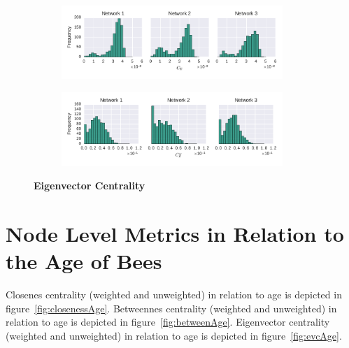 \begin{figure}[htb]
	\centering
	\begin{subfigure}[b]{1.0\textwidth}
	\centering
	\includegraphics[width=0.92\textwidth]{Figures/stat-evcDist}
	\label{fig:betweenevcUW}
	\end{subfigure} 
	\begin{subfigure}[b]{1.0\textwidth}
	\centering
	\includegraphics[width=0.92\textwidth]{Figures/stat-evcWDist}
	\label{fig:betweenevcW}
	\end{subfigure}
	\caption[Eigenvector Centrality]{\textbf{Eigenvector Centrality}}
	\label{fig:evcDist}
\end{figure}

\section{Node Level Metrics in Relation to the Age of Bees}

Closenes centrality (weighted and unweighted) in relation to age is depicted in figure~\ref{fig:closenessAge}. Betweennes centrality (weighted and unweighted) in relation to age is depicted in figure~\ref{fig:betweenAge}. Eigenvector centrality (weighted and unweighted) in relation to age is depicted in figure~\ref{fig:evcAge}.

